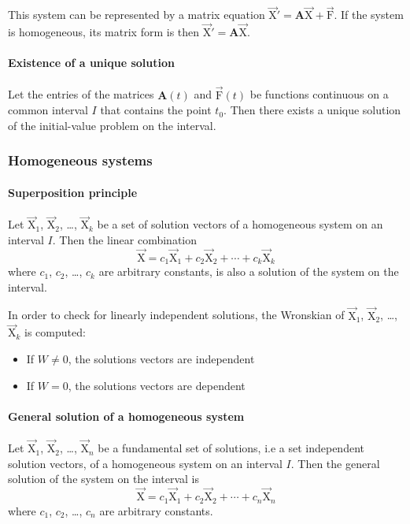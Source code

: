 \documentclass[10pt, twocolumn]{article}
\theoremstyle{definition}
\begin{document}
This system can be represented by a matrix equation \(\vec{\mathrm{X}}' = \mathbf{A}\vec{\mathrm{X}} + \vec{\mathrm{F}}\).
If the system is homogeneous, its matrix form is then \(\vec{\mathrm{X}}' = \mathbf{A}\vec{\mathrm{X}}\).

\paragraph*{Existence of a unique solution}
Let the entries of the matrices \(\mathbf{A}(t)\) and \(\vec{\mathrm{F}}(t)\) be functions continuous on a common interval \(I\) that contains the point \(t_0 \).
Then there exists a unique solution of the initial-value problem on the interval.


\subsubsection*{Homogeneous systems}
\paragraph*{Superposition principle}
Let \(\vec{\mathrm{X}}_1 \), \(\vec{\mathrm{X}}_2 \), \dots, \(\vec{\mathrm{X}}_k \) be a set of solution vectors of a homogeneous system on an interval \(I\).
Then the linear combination
\[
  \vec{\mathrm{X}} = c_1 \vec{\mathrm{X}}_1 + c_2 \vec{\mathrm{X}}_2 + \cdots + c_k \vec{\mathrm{X}}_k
\]
where \(c_1 \), \(c_2 \), \dots, \(c_k \) are arbitrary constants, is also a solution of the system on the interval.

In order to check for linearly independent solutions, the Wronskian of \(\vec{\mathrm{X}}_1 \), \(\vec{\mathrm{X}}_2 \), \dots, \(\vec{\mathrm{X}}_k \) is computed:
\begin{itemize}
  \item If \(W \neq 0\), the solutions vectors are independent
  \item If \(W = 0\), the solutions vectors are dependent
\end{itemize}

\paragraph*{General solution of a homogeneous system}
Let \(\vec{\mathrm{X}}_1 \), \(\vec{\mathrm{X}}_2 \), \dots, \(\vec{\mathrm{X}}_n \) be a fundamental set of solutions, i.e a set independent solution vectors, of a homogeneous system on an interval \(I\).
Then the general solution of the system on the interval is
\[
  \vec{\mathrm{X}} = c_1 \vec{\mathrm{X}}_1 + c_2 \vec{\mathrm{X}}_2 + \cdots + c_n \vec{\mathrm{X}}_n
\]
where \(c_1 \), \(c_2 \), \dots, \(c_n \) are arbitrary constants.
\end{document}
